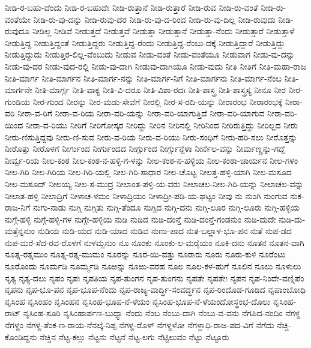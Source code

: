 ನೀಡಿ-ರ-ಬಹು-ದೆಂದು
ನೀಡಿ-ರ-ಬಹುದೇ
ನೀಡಿ-ರುತ್ತಾನೆ
ನೀಡಿ-ರುತ್ತಾರೆ
ನೀಡಿ-ರುವ
ನೀಡಿ-ರು-ವಂತೆ
ನೀಡಿ-ರು-ವಂತೆಯೇ
ನೀಡಿ-ರು-ವು-ದನ್ನು
ನೀಡಿ-ರುವು-ದರ
ನೀಡಿ-ರು-ವು-ದ-ರಿಂದ
ನೀಡಿ-ರು-ವು-ದಿಲ್ಲ
ನೀಡಿ-ರುವುದು
ನೀಡಿ-ರುವುದೂ
ನೀಡಿಲ್ಲ
ನೀಡಿವೆ
ನೀಡುತ್ತದೆ
ನೀಡುತ್ತವೆ
ನೀಡುತ್ತಾ
ನೀಡುತ್ತಾನೆ
ನೀಡುತ್ತಾ-ನೆಂದು
ನೀಡುತ್ತಾರೆ
ನೀಡುತ್ತಾಳೆ
ನೀಡುತ್ತಿದ್ದ
ನೀಡುತ್ತಿದ್ದಂತೆ
ನೀಡುತ್ತಿದ್ದರು
ನೀಡುತ್ತಿದ್ದ-ರೆಂದು
ನೀಡುತ್ತಿದ್ದ-ರೆಂಬು-ದಕ್ಕೆ
ನೀಡುತ್ತಿದ್ದಾರೆ
ನೀಡುತ್ತಿದ್ದು
ನೀಡುತ್ತಿದ್ದುದು
ನೀಡುತ್ತಿರ-ಲಿಲ್ಲ-ವೆಂಬುದು
ನೀಡುವ
ನೀಡು-ವಂತೆ
ನೀಡು-ವಂತೆಯೂ
ನೀಡುವಾಗ
ನೀಡು-ವು-ದನ್ನು
ನೀಡು-ವು-ದರ
ನೀಡು-ವುದ-ರಲ್ಲಿ
ನೀಡು-ವು-ದಾಗಿ
ನೀಡುವು-ದಾಗಿಯೂ
ನೀಡು-ವುದು
ನೀತಿ
ನೀತಿಗೆ
ನೀತಿ-ಮಹಾ-ರಾಜ
ನೀತಿ-ಮಾರ್ಗ
ನೀತಿ-ಮಾರ್ಗನ
ನೀತಿ-ಮಾರ್ಗ-ನನ್ನು
ನೀತಿ-ಮಾರ್ಗ-ನಿಗೆ
ನೀತಿ-ಮಾರ್ಗನು
ನೀತಿ-ಮಾರ್ಗ-ನೆಂಬ
ನೀತಿ-ಮಾರ್ಗನೇ
ನೀತಿ-ಮಾರ್ಗ್ಗ
ನೀತಿ-ವಾಕ್ಯ
ನೀತಿ-ವಿ-ದರೂ
ನೀತಿ-ವಿಶಾ-ರದಃ
ನೀತಿ-ಶಾಸ್ತ್ರ
ನೀತಿ-ಶಾಸ್ತ್ರಸ್ಯ
ನೀನೂ
ನೀರ
ನೀರ-ಗುಂಡಿಯ
ನೀರ-ಗುಂದ
ನೀರನ್ನು
ನೀರ-ಮಡು-ಸೇವೆಗೆ
ನೀರಲ್ಲಿ
ನೀರ-ಸ-ರದಿ-ಯನ್ನು
ನೀರಾರಂಭ
ನೀರಾರಂಭಕ್ಕೆ
ನೀರಾ-ವರಿ
ನೀರಾ-ವ-ರಿಗೆ
ನೀರಾ-ವ-ರಿಯ
ನೀರಾ-ವರಿ-ಯನ್ನು
ನೀರಾ-ವರಿ-ಯಾಗುತ್ತಿದೆ
ನೀರಾ-ವರಿ-ಯಾಗುವ
ನೀರಾ-ವರಿ-ಯಿಂದ
ನೀರಾ-ವ-ರಿಯು
ನೀರಿಗೆ
ನೀರಿಗೋಸ್ಕರ
ನೀರಿದ್ದು
ನೀರಿನ
ನೀರಿನಲ್ಲಿ
ನೀರಿನಿಂದ
ನೀರಿರುತ್ತಿದ್ದು
ನೀರಿಲ್ಲದ
ನೀರು
ನೀರು-ಣಿಸುತ್ತಿದ್ದವು
ನೀರು-ಣಿ-ಸುವ
ನೀರು-ವ-ರಿಯ
ನೀರು-ವ-ರಿಯು
ನೀರು-ಸಂಧಿಗೆ
ನೀರು-ಹರಿ-ಸಲು
ನೀರೊತ್ತನ್ನು
ನೀರೊತ್ತು
ನೀರೊಳಗೆ
ನೀರ್ಗುಂದ
ನೀರ್ಗುಂದದ
ನೀರ್ಗ್ಗುಂದ
ನೀರ್ಗ್ಗುನ್ದೆಳಾ
ನೀರ್ನೆಲ-ವನ್ನು
ನೀರ್ಮಣ್ಣನ್ನು-ಗದ್ದೆ
ನೀರ್ವ್ವ-ರಿಯ
ನೀಲ-ಕಂಠ
ನೀಲ-ಕಂಠ-ನ-ಹಳ್ಳಿ-ಗ-ಳನ್ನು
ನೀಲ-ಕಂಠ-ನ-ಹಳ್ಳಿಯ
ನೀಲ-ಕಂಠಾ-ಚಾರ್ಯನ
ನೀಲ-ಗಳಂ
ನೀಲ-ಗಿರಿ
ನೀಲ-ಗಿರಿಯ
ನೀಲ-ಗಿರಿ-ಯಲ್ಲಿ
ನೀಲ-ಗಿರಿ-ಸಾಧಾರ
ನೀಲ-ಚೊಟ್ಟ
ನೀಲತ್ತ-ಹಳ್ಳಿ-ಯಾಗಿ
ನೀಲ-ಮಸೂದ
ನೀಲ-ಮಸೂದ್
ನೀಲಯ್ಯ
ನೀಲ-ಸ-ಮುದ್ರ
ನೀಲಾಂತ-ಪಳ್ಳಿ-ಯ-ವರು
ನೀಲಾಚಲ-ನೀಲ-ಗಿರಿ-ಯನ್ನು
ನೀಲಾಚಲ-ವನ್ನು
ನೀಲಾತ-ಹಳ್ಳಿ
ನೀಲಾದ್ರಿಗೆ
ನೀಳಾಚ-ಳಮಂ
ನೀಳಾದ್ರಿಯಂ
ನೀಳಾದ್ರೀ-ಪಡಿ-ಯ-ಘಟ್ಟಂ
ನೀವು
ನು
ನುಂಗಿ
ನುಂಗುವ
ನುಕ-ರಾಜ-ನಿಗೆ
ನುಗು-ನಾಡು
ನುಗ್ಗಿ
ನುಗ್ಗಿತು
ನುಗ್ಗಿ-ತೆಂದೂ
ನುಗ್ಗಿದ
ನುಗ್ಗಿ-ದನು
ನುಗ್ಗಿ-ಲೂರ
ನುಗ್ಗಿ-ಲೂರು
ನುಗ್ಗಿ-ಹಳ್ಳಿಯ
ನುಗ್ಗೆ-ಹಳ್ಳಿ
ನುಗ್ಗೆ-ಹಳ್ಳಿ-ಗಳ
ನುಗ್ಗೇ-ಹಳ್ಳಿಯ
ನುಡಿ
ನುಡಿದ
ನುಡಿ-ದಂನ್ತೆ
ನುಡಿ-ದಂನ್ತೆ-ಗಂಡನುಂ
ನುಡಿ-ದುದೇ
ನುಡಿ-ದು-ಮತ್ತೆನ್ನನುಂ
ನುಡಿಯ
ನುಡಿ-ಯದ
ನುಡಿ-ಯಾದ
ನುಡಿವ
ನುಣು-ಪಾದ
ನುತ-ಬಲ್ಲಾಳ-ಭೂ-ಪನ
ನುತೆ
ನುಪ-ಡದ
ನುಪ-ಮರೆ-ಸೆದ-ರವ-ರೊಳಗೆ
ನುಳಮ್ಬನುಂ
ನೂ
ನೂಂಕು
ನೂಂಕು-ಲ-ಮರೈಯಂ
ನೂಕಿ-ದನು
ನೂತನ
ನೂತನ-ವಾಗಿ
ನೂತ್ನ-ರತ್ನಮುಂ
ನೂತ್ನ-ರತ್ನ-ಮುಮಂ
ನೂರನ್ನು
ನೂರ-ಯಿ-ವತ್ತು
ನೂರಾರು
ನೂರು
ನೂರು-ಕುಳಿ
ನೂರೆಂಟು
ನೂರೊಂದು
ನೂರ್ಮಡಿ
ನೂರ್ಮ್ಮಡಿ
ನೂಱನ್ನು
ನೂಱು-ವರಹ
ನೂಲ
ನೂಲ-ಕಳ-ಹುಗೆ
ನೂಲಿನ
ನೂಲು
ನೂಳುಲು
ನೃತ್ಯ
ನೃತ್ಯ-ದಲು
ನೃಪಂ
ನೃಪಃ
ನೃಪತಿಯ
ನೃಪ-ತುಂಗನ
ನೃಪ-ತುಂಗನು
ನೃಪತೇ
ನೃಪತೇಃ
ನೃಪನ
ನೃಪ-ನಿಂದೇ-ವಣ್ನಿಪೆಂ
ನೃಪನು
ನೃಪ-ಭೂ-ಪನ
ನೃಪ-ಭೂಪ-ನೆಂದು
ನೃಪ-ರಾಜ್ಯ-ವಾರ್ದ್ಧಿ-ಸಂವರ್ದ್ಧನ
ನೃಪ-ರಿಂದೊಡ-ಗೂಡಿದ
ನೃಪಾಂಬೋಧಿ
ನೃಸಿಂಹ
ನೃಸಿಂಹಂ
ನೃಸಿಂಹನ
ನೃಸಿಂಹ-ಭೂಪ-ನೆ-ಳೆಯಂ
ನೃಸಿಂಹ-ಭೂಪ-ನೆ-ಳೆಯಂದೋಸ್ಥಂಭ-ದೊಲು
ನೃಸಿಂಹ-ರಾಟ್
ನೃಸಿಂಹ-ಸೂರಿ
ನೃಸಿಂಹಾರ್ಪಣ-ಬುಧ್ಯಾ
ನೆಂದು
ನೆಂಬ
ನೆಂಬು-ದಾಗಿ
ನೆಂಬು-ವ-ವನು
ನೆಗಪಿದ-ನಂದಿಂ
ನೆಗಳ್ದ
ನೆಗಳ್ದಂ
ನೆಗಳ್ದ-ತೆಂಕ-ಣ-ರಾಯ-ನೆನಲ್ಕೆ-ನಿಪ್ಪ
ನೆಗಳ್ದ-ರೊಳ್
ನೆಗಳ್ದಳೋ
ನೆಗಳ್ದಾಧಿ-ರಾಜ-ಪದ-ವಿಗೆ
ನೆಗೆದು
ನೆಚ್ಚಿ-ಕೊಂಡಿದ್ದನು
ನೆಚ್ಚಿನ
ನೆಟ್ಟ-ಕಲ್ಲು
ನೆಟ್ಟನು
ನೆಟ್ಟನೆ
ನೆಟ್ಟ-ಲಗು
ನೆಟ್ಟಿಲುವಂ
ನೆಟ್ಟು
ನೆಟ್ಟೂರು
